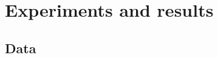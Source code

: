 \section{Experiments and results}
\label{sec:experiments_and_results}

\subsection{Data}
\label{sec:data}



% 

% 





% 
% 
% 
% 
